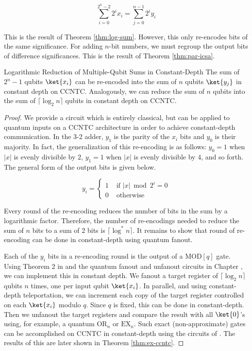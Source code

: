 \begin{equation}
\sum_{i=0}^{2^n - 2} 2^i x_i = \sum_{j=0}^{n-1} 2^i y_i
\end{equation}

This is the result of Theorem \ref{thm:log-sum}.
However, this only re-encodes bits of the same significance. For adding
$n$-bit numbers, we must regroup the output bits of difference
significances. This is the result of Theorem \ref{thm:par-icsa}.

\begin{theorem}{Logarithmic Reduction of Multiple-Qubit Sums in Constant-Depth}
The sum of $2^n -1$ qubits $\ket{x_i}$
can be re-encoded into the sum of $n$ qubits $\ket{y_j}$ in
constant depth on CCNTC. Analogously, we can reduce the sum of
$n$ qubits into the sum of $\lceil \log_2 n \rceil$ qubits in
constant depth on CCNTC.
\label{thm:log-sum}
\end{theorem}

\begin{proof}
We provide a circuit which is entirely classical, but can be applied to
quantum inputs on a CCNTC architecture in order to achieve
constant-depth communication.
In the 3-2 adder, $y_1$ is the parity of the $x_i$ bits and
$y_0$ is their majority. In fact, the 
generalization of this re-encoding is as follows:
$y_0=1$ when $|x|$ is evenly divisible by $2$, $y_1=1$ when
$|x|$ is evenly divisible by $4$, and so forth. The general
form of the output bits is given below.

\begin{equation}
y_i = \left\{
\begin{array}{rl}
1 & \text{ if } |x| \bmod 2^i = 0 \\
0 & \text{ otherwise } 
\end{array}
\end{equation}

Every round of the re-encoding reduces the number of bits in the
sum by a logarithmic factor. Therefore, the number of re-encodings
needed to reduce the sum of $n$ bits to a sum of $2$ bits is
$\lceil \log^*n \rceil$. It remains to show that round of re-encoding
can be done in constant-depth using quantum fanout.

Each of the $y_i$ bits in a re-encoding round is the output of a
$\text{MOD}[q]$ gate. Using Theorem 2 in \cite{Hoyer2002} and the
quantum fanout and unfanout circuits in Chapter \cite{chap:factor-polylog},
we can
implement this in constant depth. We fanout a target register of
$\lceil \log_2 n \rceil$ qubits $n$ times, one per input qubit $\ket{x_i}$.
In parallel, and using constant-depth teleportation, we can increment
each copy of the target register controlled on each $\ket{x_i}$ modulo
$q$. Since $q$ is fixed, this can be done in constant-depth. Then
we unfanout the target registers and compare the result with all $\ket{0}$'s
using, for example, a quantum $\text{OR}_n$ or $\text{EX}_n$. Such exact
(non-approximate) gates can be accomplished on CCNTC in constant-depth
using the circuits of \cite{Takahashi2011}. The results of this are later shown
in Theorem \ref{thm:ex-ccntc}.
\end{proof}

